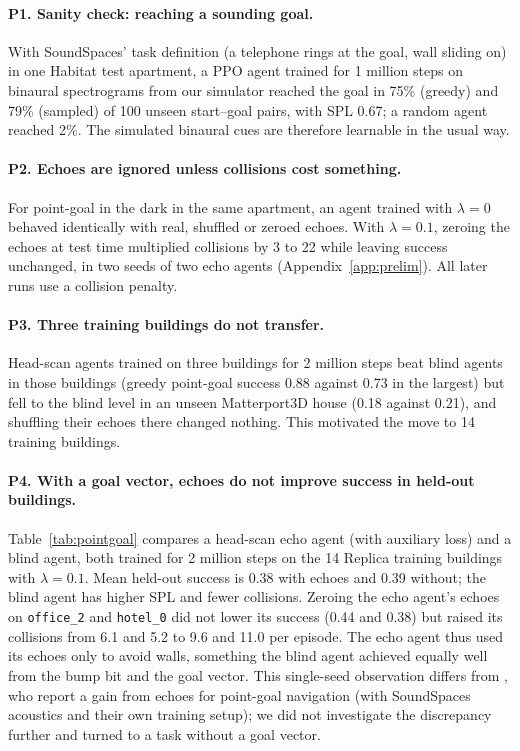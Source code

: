 \documentclass[10pt]{article}
\begin{document}
\paragraph{P1. Sanity check: reaching a sounding goal.} With SoundSpaces' task definition (a telephone rings at the goal, wall sliding on) in one Habitat test apartment, a PPO agent trained for 1 million steps on binaural spectrograms from our simulator reached the goal in 75\% (greedy) and 79\% (sampled) of 100 unseen start--goal pairs, with SPL 0.67; a random agent reached 2\%. The simulated binaural cues are therefore learnable in the usual way.

\paragraph{P2. Echoes are ignored unless collisions cost something.} For point-goal in the dark in the same apartment, an agent trained with $\lambda=0$ behaved identically with real, shuffled or zeroed echoes. With $\lambda=0.1$, zeroing the echoes at test time multiplied collisions by 3 to 22 while leaving success unchanged, in two seeds of two echo agents (Appendix~\ref{app:prelim}). All later runs use a collision penalty.

\paragraph{P3. Three training buildings do not transfer.} Head-scan agents trained on three buildings for 2 million steps beat blind agents in those buildings (greedy point-goal success 0.88 against 0.73 in the largest) but fell to the blind level in an unseen Matterport3D house (0.18 against 0.21), and shuffling their echoes there changed nothing. This motivated the move to 14 training buildings.

\paragraph{P4. With a goal vector, echoes do not improve success in held-out buildings.} Table~\ref{tab:pointgoal} compares a head-scan echo agent (with auxiliary loss) and a blind agent, both trained for 2 million steps on the 14 Replica training buildings with $\lambda=0.1$. Mean held-out success is 0.38 with echoes and 0.39 without; the blind agent has higher SPL and fewer collisions. Zeroing the echo agent's echoes on \texttt{office\_2} and \texttt{hotel\_0} did not lower its success (0.44 and 0.38) but raised its collisions from 6.1 and 5.2 to 9.6 and 11.0 per episode. The echo agent thus used its echoes only to avoid walls, something the blind agent achieved equally well from the bump bit and the goal vector. This single-seed observation differs from \citet{zhu2022beyond}, who report a gain from echoes for point-goal navigation (with SoundSpaces acoustics and their own training setup); we did not investigate the discrepancy further and turned to a task without a goal vector.
\end{document}
